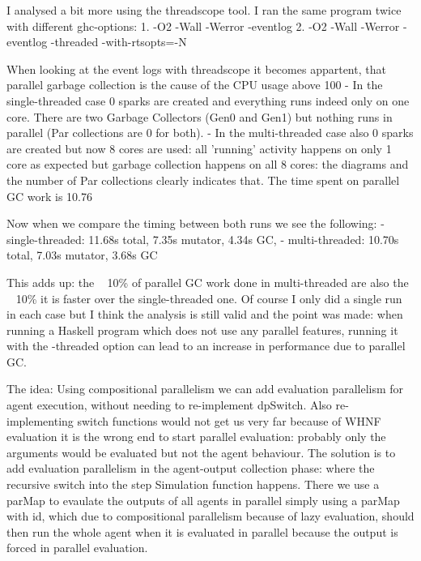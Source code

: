 I analysed a bit more using the threadscope tool. I ran the same program twice with different ghc-options:
1. -O2 -Wall -Werror -eventlog 
2. -O2 -Wall -Werror -eventlog -threaded -with-rtsopts=-N

When looking at the event logs with threadscope it becomes appartent, that parallel garbage collection is the cause of the CPU usage above 100%
-  In the single-threaded case 0 sparks are created and everything runs indeed only on one core. There are two Garbage Collectors (Gen0 and Gen1) but nothing runs in parallel (Par collections are 0 for both).
- In the multi-threaded case also 0 sparks are created but now 8 cores are used: all 'running' activity happens on only 1 core as expected but garbage collection happens on all 8 cores: the diagrams and the number of Par collections clearly indicates that. The time spent on parallel GC work is 10.76%

Now when we compare the timing between both runs we see the following: 
- single-threaded: 11.68s total, 7.35s mutator, 4.34s GC,
- multi-threaded: 10.70s total, 7.03s mutator, 3.68s GC

This adds up: the ~ 10\% of parallel GC work done in multi-threaded are also the ~ 10\% it is faster over the single-threaded one. Of course I only did a single run in each case but I think the analysis is still valid and the point was made: when running a Haskell program which does not use any parallel features, running it with the -threaded option can lead to an increase in performance due to parallel GC.


The idea:
Using compositional parallelism we can add evaluation parallelism for agent execution, without needing to re-implement dpSwitch. Also re-implementing switch functions would not get us very far because of WHNF evaluation it is the wrong end to start parallel evaluation: probably only the arguments would be evaluated but not the agent behaviour. The solution is to add evaluation parallelism in the agent-output collection phase: where the recursive switch into the step Simulation function happens. There we use a parMap to evaulate the outputs of all agents in parallel simply using a parMap with id, which due to compositional parallelism because of lazy evaluation, should then run the whole agent when it is evaluated in parallel because the output is forced in parallel evaluation.

